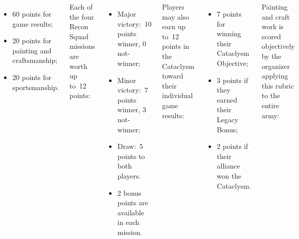 \begin{columns}
\begin{itemize}\shortlist
\item 60 points for game results;
\item 20 points for painting and craftsmanship;
\item 20 points for sportsmanship.
\end{itemize}


Each of the four Recon Squad missions are worth up to~12 points:


\begin{itemize}\shortlist
\item Major victory:~10 points winner, 0 not-winner;
\item Minor victory:~7 points winner, 3 not-winner;
\item Draw:~5 points to both players.
\item 2 bonus points are available in each mission.
\end{itemize}


Players may also earn up to~12 points in the Cataclysm toward their
individual game results:
\begin{itemize}\shortlist
\item 7 points for winning their Cataclysm Objective;
\item 3 points if they earned their Legacy Bonus;
\item 2 points if their alliance won the Cataclysm.
\end{itemize}

\columnbreak
{} 

Painting and craft work is scored objectively by the organizer
applying this rubric to the entire army:


\end{columns}
